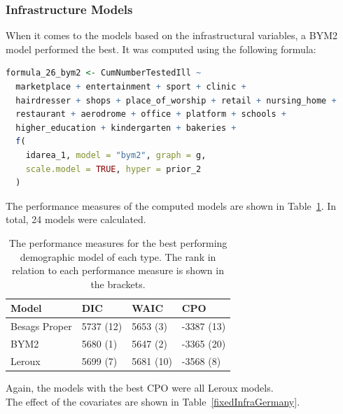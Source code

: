 \subsubsection{Infrastructure Models}
When it comes to the models based on the infrastructural variables, a BYM2 model performed the best. It was computed using the following formula: 
\begin{lstlisting}[language=R]
formula_26_bym2 <- CumNumberTestedIll ~
  marketplace + entertainment + sport + clinic +
  hairdresser + shops + place_of_worship + retail + nursing_home +
  restaurant + aerodrome + office + platform + schools + 
  higher_education + kindergarten + bakeries + 
  f(
    idarea_1, model = "bym2", graph = g,
    scale.model = TRUE, hyper = prior_2
  )
\end{lstlisting}
The performance measures of the computed models are shown in Table~\ref{infraGermany}. In total, 24 models were calculated.
\begin{table}[H] 
\caption{The performance measures for the best performing demographic model of each type. The rank in relation to each performance measure is shown in the brackets. \label{infraGermany}}
\begin{tabular}{l l l l}
\toprule
\textbf{Model}	& \textbf{DIC}	& \textbf{WAIC} & \textbf{CPO} \\
\midrule
Besags Proper & 5737 (12) & 5653 (3) & -3387 (13)\\
BYM2 & 5680 (1) & 5647 (2) & -3365 (20)\\
Leroux & 5699 (7) & 5681 (10) & -3568 (8) \\
\bottomrule
\end{tabular}
\end{table}
Again, the models with the best CPO were all Leroux models. \\
The effect of the covariates are shown in Table~\ref{fixedInfraGermany}.
